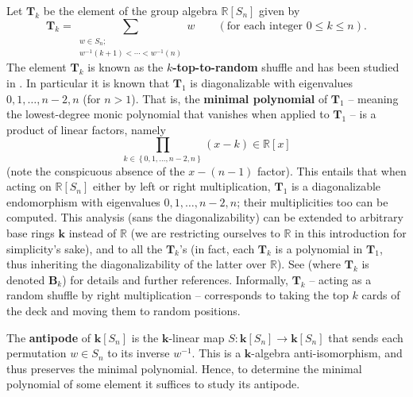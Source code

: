 \documentclass[12pt]{article}
\theoremstyle{definition}%
\theoremstyle{definition}%
\theoremstyle{remark}%
\newcommand{\tup}[1]{\left( #1 \right)}
\newcommand{\set}[1]{\left\{ #1 \right\}}
\newcommand{\RR}{\mathbb{R}}
\newcommand{\kk}{\mathbf{k}}
\newcommand{\ksn}{\kk\left[S_n\right]}
\newcommand{\BB}{\mathbf{B}}
\newcommand{\TT}{\mathbf{T}}
\newcommand{\defin}[1]{\textbf{#1}}
\begin{document}
Let $\TT_k$ be the element of the group algebra $\RR[S_n]$ given by
\[
\TT_k = \sum_{\substack{w \in S_n;\\ w^{-1}\tup{ k+1 } < \cdots < w^{-1}\tup{ n }}} w \qquad\tup{ \text{for each integer } 0 \leq k \leq n}.
\]
The element $ \TT_k $ is known as the \defin{$k$-top-to-random} shuffle and has been studied in \cite{Phatar91}.
In particular it is known that $\TT_1$ is diagonalizable with eigenvalues $0, 1, \ldots, n-2, n$ (for $n>1$).
That is, the \defin{minimal polynomial} of $\TT_1$ -- meaning the lowest-degree monic polynomial that vanishes when applied to $\TT_1$ -- is a product of linear factors, namely
\[
\prod_{k \in \set{0, 1, \ldots, n-2, n}} \tup{x-k} \in \RR[x]
\]
(note the conspicuous absence of the $x-\tup{n-1}$ factor).
This entails that when acting on $\RR[S_n]$ either by left or right multiplication, $\TT_1$ is a diagonalizable endomorphism with eigenvalues $0, 1, \ldots, n-2, n$; their multiplicities too can be computed.
This analysis (sans the diagonalizability) can be extended to arbitrary base rings $\kk$ instead of $\RR$ (we are restricting ourselves to $\RR$ in this introduction for simplicity's sake),
and to all the $\TT_k$'s (in fact, each $\TT_k$ is a polynomial in $\TT_1$, thus inheriting the diagonalizability of the latter over $\RR$).
See \cite{MO308600} (where $\TT_k$ is denoted $\BB_k$) for details and further references.
Informally, $\TT_k$ -- acting as a random shuffle by right multiplication -- corresponds to taking the top $k$ cards of the deck and moving them to random positions.

The \defin{antipode} of $ \ksn $ is the $ \kk $-linear map $ S : \ksn \to \ksn $ that sends each permutation $ w \in S_{n} $ to its inverse $ w^{-1} $.
This is a $ \kk $-algebra anti-isomorphism, and thus preserves the minimal polynomial.
Hence, to determine the minimal polynomial of some element it suffices to study its antipode.
\end{document}
